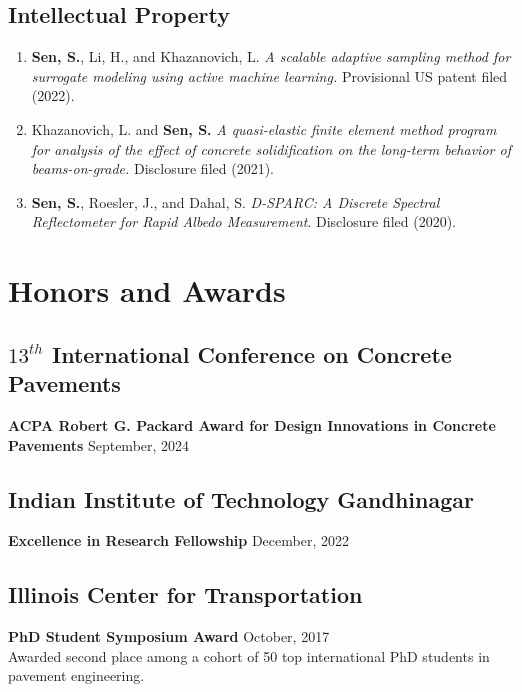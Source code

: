 \documentclass[12pt]{article}
\begin{document}
\hfill
\subsection*{Intellectual Property}
\begin{enumerate}
	\item \textbf{Sen, S.}, Li, H., and  Khazanovich, L. \textit{A scalable adaptive sampling method for surrogate modeling using active machine learning.} Provisional US patent filed (2022).
	\item Khazanovich, L. and \textbf{Sen, S.} \textit{A quasi-elastic finite element method program for analysis of the effect of concrete solidification on the long-term behavior of beams-on-grade.} Disclosure filed (2021).
	\item \textbf{Sen, S.}, Roesler, J., and Dahal, S. \textit{D-SPARC: A Discrete Spectral Reflectometer for Rapid Albedo Measurement}. Disclosure filed (2020). 
\end{enumerate} 

\bigskip
\section*{Honors and Awards}
\hfill
\subsection*{$13^{th}$ International Conference on Concrete Pavements}
\textbf{ACPA Robert G. Packard Award for Design Innovations in Concrete Pavements} \hfill September, 2024  \\

\subsection*{Indian Institute of Technology Gandhinagar}
\textbf{Excellence in Research Fellowship} \hfill December, 2022 \\

\subsection*{Illinois Center for Transportation}
\textbf{PhD Student Symposium Award} \hfill October, 2017 \\
Awarded second place among a cohort of 50 top international PhD students in pavement engineering. \\
\end{document}
